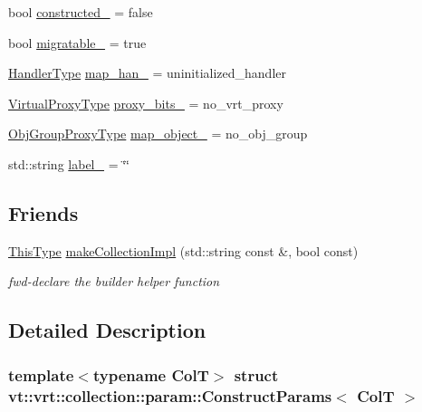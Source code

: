 \begin{DoxyCompactItemize}
\item 
bool \hyperlink{structvt_1_1vrt_1_1collection_1_1param_1_1_construct_params_afa286d4b8ca9798c7cf70f2a039ee49d}{constructed\+\_\+} = false
\item 
bool \hyperlink{structvt_1_1vrt_1_1collection_1_1param_1_1_construct_params_a811d67f8d46e6b6ad2736bba81201354}{migratable\+\_\+} = true
\item 
\hyperlink{namespacevt_af64846b57dfcaf104da3ef6967917573}{Handler\+Type} \hyperlink{structvt_1_1vrt_1_1collection_1_1param_1_1_construct_params_adfb5a4ecef96e720c6f8d48ac3f52706}{map\+\_\+han\+\_\+} = uninitialized\+\_\+handler
\item 
\hyperlink{namespacevt_a1b417dd5d684f045bb58a0ede70045ac}{Virtual\+Proxy\+Type} \hyperlink{structvt_1_1vrt_1_1collection_1_1param_1_1_construct_params_a459e1541fd22e637a616ca1f1f899124}{proxy\+\_\+bits\+\_\+} = no\+\_\+vrt\+\_\+proxy
\item 
\hyperlink{namespacevt_ad7cae989df485fccca57f0792a880a8e}{Obj\+Group\+Proxy\+Type} \hyperlink{structvt_1_1vrt_1_1collection_1_1param_1_1_construct_params_a91859be49e51c141fd83e27499d5d582}{map\+\_\+object\+\_\+} = no\+\_\+obj\+\_\+group
\item 
std\+::string \hyperlink{structvt_1_1vrt_1_1collection_1_1param_1_1_construct_params_a03e3b8668635821b4d55c7d8eacc8ce8}{label\+\_\+} = \char`\"{}\char`\"{}
\end{DoxyCompactItemize}
\subsection*{Friends}
\begin{DoxyCompactItemize}
\item 
\hyperlink{structvt_1_1vrt_1_1collection_1_1param_1_1_construct_params_a13d4910c0f6825c7b0ddfebce5288bea}{This\+Type} \hyperlink{structvt_1_1vrt_1_1collection_1_1param_1_1_construct_params_a0a457c87881e20be925176bb4390bff4}{make\+Collection\+Impl} (std\+::string const \&, bool const)
\begin{DoxyCompactList}\small\item\em fwd-\/declare the builder helper function \end{DoxyCompactList}\end{DoxyCompactItemize}


\subsection{Detailed Description}
\subsubsection*{template$<$typename ColT$>$\newline
struct vt\+::vrt\+::collection\+::param\+::\+Construct\+Params$<$ Col\+T $>$}

